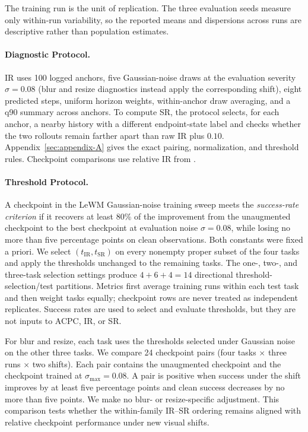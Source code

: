\documentclass[10pt]{article}
\newcommand{\stdmax}{\ensuremath{\sigma_{\max}}}
\begin{document}
The training run is the unit of replication. The three evaluation seeds
measure only within-run variability, so the reported means and dispersions
across runs are descriptive rather than population estimates.

\paragraph{Diagnostic Protocol.}
IR uses 100 logged anchors, five Gaussian-noise draws at the
evaluation severity $\sigma=0.08$ (blur and resize diagnostics instead apply
the corresponding shift), eight predicted steps,
uniform horizon weights, within-anchor draw averaging, and a q90 summary
across anchors. To compute SR, the protocol selects, for each anchor, a nearby
history with a different endpoint-state label and checks whether the two
rollouts remain farther apart than raw IR plus $0.10$.
Appendix~\ref{sec:appendix-A} gives the exact pairing,
normalization, and threshold rules. Checkpoint comparisons use relative IR
from .

\paragraph{Threshold Protocol.}
A checkpoint in the LeWM Gaussian-noise training sweep meets the
\emph{success-rate criterion} if it
recovers at least 80\% of the improvement from the unaugmented checkpoint to
the best checkpoint at evaluation noise $\sigma=0.08$, while losing no more
than five percentage points on clean observations. Both constants were fixed
a priori. We select $(t_{\mathrm{IR}},t_{\mathrm{SR}})$ on every nonempty proper
subset of the four tasks and apply the thresholds unchanged to the remaining tasks. The one-,
two-, and three-task selection settings produce $4+6+4=14$ directional
threshold-selection/test partitions. Metrics first average training runs
within each test task and then weight tasks equally; checkpoint rows are never
treated as independent replicates. Success rates are used to select and
evaluate thresholds, but they are not inputs to ACPC, IR, or SR.

For blur and resize, each task uses the thresholds selected under Gaussian
noise on the other three tasks. We compare 24 checkpoint pairs (four tasks
$\times$ three
runs $\times$ two shifts). Each pair contains the unaugmented checkpoint and
the checkpoint trained at $\stdmax{}=0.08$. A pair is positive when success
under the shift improves by at least five percentage points and clean success
decreases by no more than five points. We make no blur- or resize-specific
adjustment. This comparison tests whether the within-family IR--SR ordering
remains aligned with relative checkpoint performance under new visual shifts.
\end{document}
